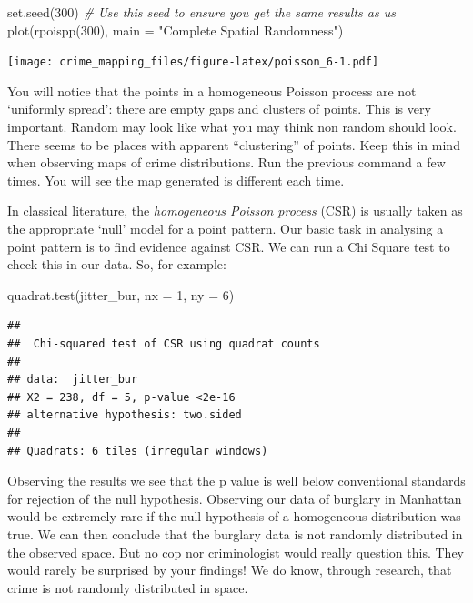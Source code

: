 \documentclass[
  krantz2]{krantz}
\makeatletter
\newenvironment{Shaded}{\begin{snugshade}}{\end{snugshade}}
\newcommand{\AttributeTok}[1]{\textcolor[rgb]{0.61,0.61,0.61}{#1}}
\newcommand{\CommentTok}[1]{\textcolor[rgb]{0.37,0.37,0.37}{\textit{#1}}}
\newcommand{\DecValTok}[1]{\textcolor[rgb]{0.06,0.06,0.06}{#1}}
\newcommand{\FunctionTok}[1]{\textcolor[rgb]{0,0,0}{#1}}
\newcommand{\NormalTok}[1]{#1}
\newcommand{\StringTok}[1]{\textcolor[rgb]{0.5,0.5,0.5}{#1}}
\newenvironment{kframe}{%
\medskip{}
\setlength{\fboxsep}{.8em}
 \def\at@end@of@kframe{}%
 \ifinner\ifhmode%
  \def\at@end@of@kframe{\end{minipage}}%
  \begin{minipage}{\columnwidth}%
 \fi\fi%
 \def\FrameCommand##1{\hskip\@totalleftmargin \hskip-\fboxsep
 \colorbox{shadecolor}{##1}\hskip-\fboxsep
     \hskip-\linewidth \hskip-\@totalleftmargin \hskip\columnwidth}%
 \MakeFramed {\advance\hsize-\width
   \@totalleftmargin\z@ \linewidth\hsize
   \@setminipage}}%
 {\par\unskip\endMakeFramed%
 \at@end@of@kframe}
\renewenvironment{Shaded}{\begin{kframe}}{\end{kframe}}
\makeatother
\begin{document}
\begin{Shaded}
\begin{Highlighting}[]
\FunctionTok{set.seed}\NormalTok{(}\DecValTok{300}\NormalTok{) }\CommentTok{\# Use this seed to ensure you get the same results as us}
\FunctionTok{plot}\NormalTok{(}\FunctionTok{rpoispp}\NormalTok{(}\DecValTok{300}\NormalTok{), }\AttributeTok{main =} \StringTok{"Complete Spatial Randomness"}\NormalTok{)}
\end{Highlighting}
\end{Shaded}

\texttt{[image: crime\_mapping\_files/figure-latex/poisson\_6-1.pdf]}

You will notice that the points in a homogeneous Poisson process are not `uniformly spread': there are empty gaps and clusters of points. This is very important. Random may look like what you may think non random should look. There seems to be places with apparent ``clustering'' of points. Keep this in mind when observing maps of crime distributions. Run the previous command a few times. You will see the map generated is different each time.

In classical literature, the \emph{homogeneous Poisson process} (CSR) is usually taken as the appropriate `null' model for a point pattern. Our basic task in analysing a point pattern is to find evidence against CSR. We can run a Chi Square test to check this in our data. So, for example:

\begin{Shaded}
\begin{Highlighting}[]
\FunctionTok{quadrat.test}\NormalTok{(jitter\_bur, }\AttributeTok{nx =} \DecValTok{1}\NormalTok{, }\AttributeTok{ny =} \DecValTok{6}\NormalTok{)}
\end{Highlighting}
\end{Shaded}

\begin{verbatim}
## 
##  Chi-squared test of CSR using quadrat counts
## 
## data:  jitter_bur
## X2 = 238, df = 5, p-value <2e-16
## alternative hypothesis: two.sided
## 
## Quadrats: 6 tiles (irregular windows)
\end{verbatim}

Observing the results we see that the p value is well below conventional standards for rejection of the null hypothesis. Observing our data of burglary in Manhattan would be extremely rare if the null hypothesis of a homogeneous distribution was true. We can then conclude that the burglary data is not randomly distributed in the observed space. But no cop nor criminologist would really question this. They would rarely be surprised by your findings! We do know, through research, that crime is not randomly distributed in space.
\end{document}
